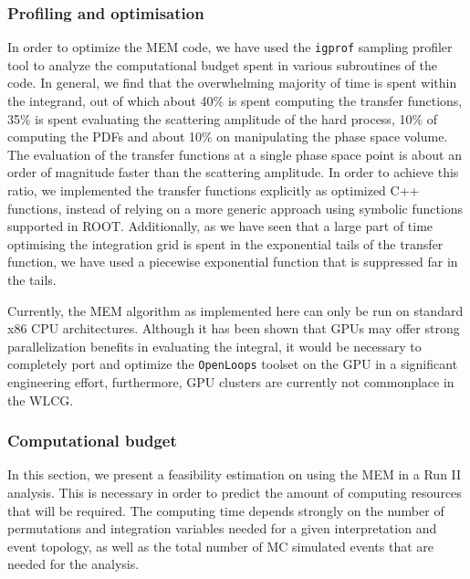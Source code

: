\subsubsection{Profiling and optimisation}
\label{sec:mem_optimization}

In order to optimize the MEM code, we have used the \texttt{igprof} sampling profiler tool to analyze the computational budget spent in various subroutines of the code. In general, we find    
that the overwhelming majority of time is spent within the integrand, out of which about 40\% is spent computing the transfer functions, 35\% is spent evaluating the scattering amplitude of the hard process, 10\% of computing the PDFs and about 10\% on manipulating the phase space volume. The evaluation of the transfer functions at a single phase space point is about an order of magnitude faster than the scattering amplitude. In order to achieve this ratio, we implemented the transfer functions explicitly as optimized C++ functions, instead of relying on a more generic approach using symbolic functions supported in ROOT. Additionally, as we have seen that a large part of time optimising the integration grid is spent in the exponential tails of the transfer function, we have used a piecewise exponential function that is suppressed far in the tails.

Currently, the MEM algorithm as implemented here can only be run on standard x86 CPU architectures. Although it has been shown that GPUs may offer strong parallelization benefits in evaluating the integral, it would be necessary to completely port and optimize the \texttt{OpenLoops} toolset on the GPU in a significant engineering effort\cite{Schouten:2014yza}, furthermore, GPU clusters are currently not commonplace in the WLCG.

\subsubsection{Computational budget}
\label{sec:mem_computational}
In this section, we present a feasibility estimation on using the MEM in a Run II analysis. This is necessary in order to predict the amount of computing resources that will be required. The computing time depends strongly on the number of permutations and integration variables needed for a given interpretation and event topology, as well as the total number of MC simulated events that are needed for the analysis.

